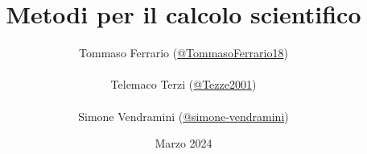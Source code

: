 \documentclass[a4paper, 15pt, oneside]{book}
\title{Metodi per il calcolo scientifico}
\author{Tommaso Ferrario (\href{https://github.com/TommasoFerrario18}{@TommasoFerrario18}) \\\\
Telemaco Terzi (\href{https://github.com/Tezze2001}{@Tezze2001}) \\\\
Simone Vendramini (\href{https://github.com/simone-vendramini}{@simone-vendramini})}
\date{Marzo 2024}
\begin{document}
\maketitle
\newtheorem{teorema}{Teorema}
\newtheorem{dimostrazione}{Dimostrazione}
\newtheorem{definizione}{Definizione}
\newtheorem{esempio}{Esempio}
\newtheorem{osservazione}{Osservazione}
\newtheorem{nota}{Nota}
\newtheorem{corollario}{Corollario}
\tableofcontents
\renewcommand{\chaptermark}[1]{
    \markboth{\chaptername
        \ \thechapter.\ #1}{}}
\renewcommand{\sectionmark}[1]{\markright{\thesection.\ #1}}






\end{document}
